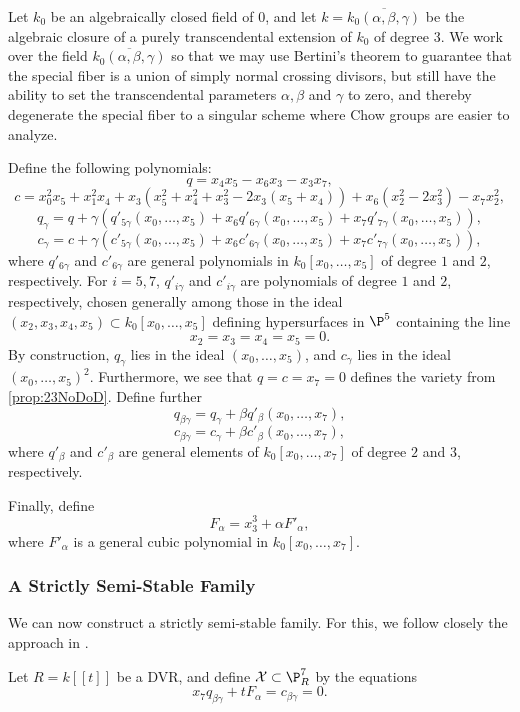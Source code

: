 Let $k_0$ be an algebraically closed field of $0$, and let $k = \overline{k_0(\alpha, \beta, \gamma)}$ be the algebraic closure of a purely transcendental extension of $k_0$ of degree 3. We work over the field $\overline{k_0(\alpha, \beta, \gamma)}$ so that we may use Bertini's theorem to guarantee that the special fiber is a union of simply normal crossing divisors, but still have the ability to set the transcendental parameters $\alpha, \beta$ and $\gamma$ to zero, and thereby degenerate the special fiber to a singular scheme where Chow groups are easier to analyze.

Define the following polynomials:
\[q = x_4x_5 - x_6x_3 - x_3x_7, \]
\[c = x_0^2x_5 + x_1^2x_4 + x_3\left(x_5^2 + x_4^2 + x_3^2 - 2x_3(x_5 + x_4)\right) + x_6(x_2^2 - 2x_3^2)  - x_7x_2^2, \]
\[q_{\gamma} = q + \gamma \left(q'_{5\gamma}(x_0,\dots,x_5) + x_6q'_{6\gamma}(x_0,\dots,x_5) + x_7q'_{7\gamma}(x_0,\dots,x_5)\right), \]
\[c_{\gamma} = c + \gamma \left(c'_{5 \gamma}(x_0,\dots,x_5) + x_6c'_{6\gamma}(x_0,\dots,x_5) + x_7c'_{7\gamma}(x_0,\dots,x_5)\right), \]
where $q'_{6\gamma}$ and $c'_{6\gamma}$ are general polynomials in $k_0[x_0,\dots,x_5]$ of degree $1$ and $2$, respectively. For $i = 5,7$, $q'_{i\gamma}$ and $c'_{i\gamma}$ are polynomials of degree $1$ and $2$, respectively, chosen generally among those in the ideal $(x_2,x_3,x_4,x_5) \subset k_0[x_0,\dots,x_5]$ \ie defining hypersurfaces in $\P^5$ containing the line
\begin{equation}
  \label{eq:LineGeneralChoice}
  x_2 = x_3 = x_4 = x_5 = 0.
\end{equation}
 By construction, $q_{\gamma}$ lies in the ideal $(x_0,\dots,x_5)$, and $c_{\gamma}$ lies in the ideal $(x_0,\dots,x_5)^2$. Furthermore, we see that $q=c=x_7=0$ defines the variety from \cref{prop:23NoDoD}.
Define further
\[q_{\beta \gamma} = q_\gamma + \beta q'_\beta(x_0,\dots,x_7), \]
\[c_{\beta \gamma} = c_\gamma + \beta c'_\beta(x_0,\dots,x_7),\]
where $q'_\beta$ and $c'_\beta$ are general elements of $k_0[x_0,\dots,x_7]$ of degree $2$ and $3$, respectively.

Finally, define 
\[ F_\alpha = x_3^3 + \alpha F'_\alpha,\]
where $F'_\alpha$ is a general cubic polynomial in $k_0[x_0,\dots,x_7]$.

\subsubsection{A Strictly Semi-Stable Family}
We can now construct a strictly semi-stable family. For this, we follow closely the approach in \cite{PavicSchreieder}.
\begin{definition}
	\label{def:MathcalX}
	Let $R = k[[t]]$ be a DVR, and define $\mathcal{X} \subset \P^7_R$ by the equations
	\begin{equation}
		\label{eq:XDefinition}
		x_7q_{\beta \gamma} + tF_\alpha = c_{\beta \gamma} = 0.
	\end{equation}
\end{definition}


